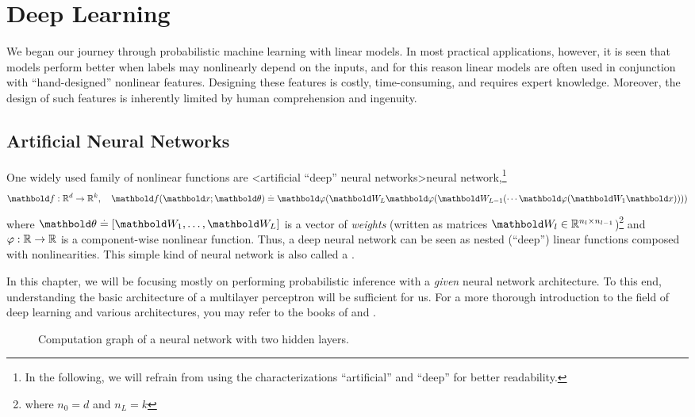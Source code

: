 \chapter{Deep Learning}\label{sec:bdl}

We began our journey through probabilistic machine learning with linear models.
In most practical applications, however, it is seen that models perform better when labels may nonlinearly depend on the inputs, and for this reason linear models are often used in conjunction with ``hand-designed'' nonlinear features.
Designing these features is costly, time-consuming, and requires expert knowledge.
Moreover, the design of such features is inherently limited by human comprehension and ingenuity.

\section{Artificial Neural Networks}

One widely used family of nonlinear functions
are \midx<artificial ``deep'' neural networks>{neural network},\footnote{In the following, we will refrain from using the characterizations ``artificial'' and ``deep'' for better readability.}
\begin{align}
  \vf : \R^d \to \R^k, \quad \vf(\vx; \vtheta) \defeq \vvarphi(\mW_L \vvarphi(\mW_{L-1} ( \cdots \vvarphi(\mW_1 \vx))))
\end{align} where $\vtheta \defeq [\mW_1, \dots, \mW_L]$ is a vector of \emph{weights} (written as matrices ${\mW_l \in \R^{n_l \times n_{l-1}}}$)\footnote{where $n_0 = d$ and $n_L = k$} and $\varphi : \mathbb{R} \to \mathbb{R}$ is a component-wise nonlinear function.
Thus, a deep neural network can be seen as nested (``deep'') linear functions composed with nonlinearities.
This simple kind of neural network is also called a .

In this chapter, we will be focusing mostly on performing probabilistic inference with a \emph{given} neural network architecture.
To this end, understanding the basic architecture of a multilayer perceptron will be sufficient for us.
For a more thorough introduction to the field of deep learning and various architectures, you may refer to the books of \cite{goodfellow2016deep} and \cite{prince2023understanding}.

\begin{figure}
  \caption{Computation graph of a neural network with two hidden layers.}\label{fig:computation_graph}
\end{figure}

